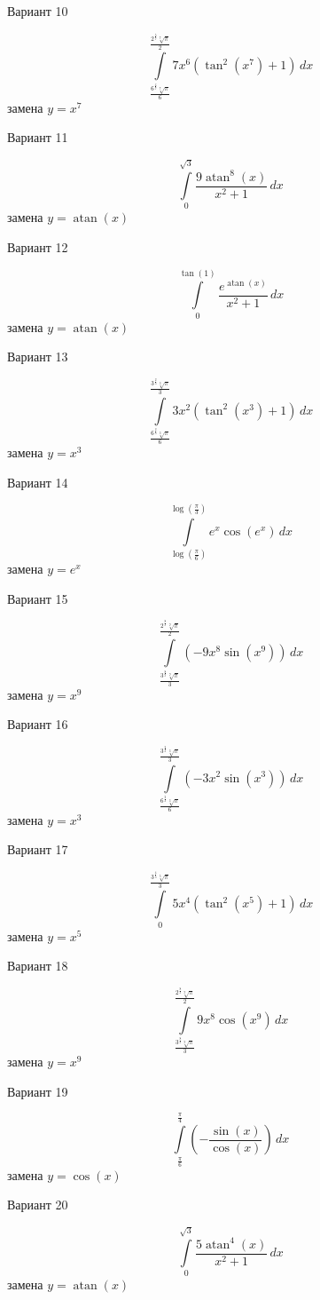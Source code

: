 \documentclass[11pt]{report}
\begin{document}
Вариант 10

$$\int\limits_{\frac{6^{\frac{6}{7}} \sqrt[7]{\pi}}{6}}^{\frac{2^{\frac{5}{7}} \sqrt[7]{\pi}}{2}} 7 x^{6} \left(\tan^{2}{\left(x^{7} \right)} + 1\right)\, dx$$
замена $y = x^{7}$

Вариант 11

$$\int\limits_{0}^{\sqrt{3}} \frac{9 \operatorname{atan}^{8}{\left(x \right)}}{x^{2} + 1}\, dx$$
замена $y = \operatorname{atan}{\left(x \right)}$

Вариант 12

$$\int\limits_{0}^{\tan{\left(1 \right)}} \frac{e^{\operatorname{atan}{\left(x \right)}}}{x^{2} + 1}\, dx$$
замена $y = \operatorname{atan}{\left(x \right)}$

Вариант 13

$$\int\limits_{\frac{6^{\frac{2}{3}} \sqrt[3]{\pi}}{6}}^{\frac{3^{\frac{2}{3}} \sqrt[3]{\pi}}{3}} 3 x^{2} \left(\tan^{2}{\left(x^{3} \right)} + 1\right)\, dx$$
замена $y = x^{3}$

Вариант 14

$$\int\limits_{\log{\left(\frac{\pi}{6} \right)}}^{\log{\left(\frac{\pi}{3} \right)}} e^{x} \cos{\left(e^{x} \right)}\, dx$$
замена $y = e^{x}$

Вариант 15

$$\int\limits_{\frac{3^{\frac{8}{9}} \sqrt[9]{\pi}}{3}}^{\frac{2^{\frac{8}{9}} \sqrt[9]{\pi}}{2}} \left(- 9 x^{8} \sin{\left(x^{9} \right)}\right)\, dx$$
замена $y = x^{9}$

Вариант 16

$$\int\limits_{\frac{6^{\frac{2}{3}} \sqrt[3]{\pi}}{6}}^{\frac{3^{\frac{2}{3}} \sqrt[3]{\pi}}{3}} \left(- 3 x^{2} \sin{\left(x^{3} \right)}\right)\, dx$$
замена $y = x^{3}$

Вариант 17

$$\int\limits_{0}^{\frac{3^{\frac{4}{5}} \sqrt[5]{\pi}}{3}} 5 x^{4} \left(\tan^{2}{\left(x^{5} \right)} + 1\right)\, dx$$
замена $y = x^{5}$

Вариант 18

$$\int\limits_{\frac{3^{\frac{8}{9}} \sqrt[9]{\pi}}{3}}^{\frac{2^{\frac{8}{9}} \sqrt[9]{\pi}}{2}} 9 x^{8} \cos{\left(x^{9} \right)}\, dx$$
замена $y = x^{9}$

Вариант 19

$$\int\limits_{\frac{\pi}{6}}^{\frac{\pi}{4}} \left(- \frac{\sin{\left(x \right)}}{\cos{\left(x \right)}}\right)\, dx$$
замена $y = \cos{\left(x \right)}$

Вариант 20

$$\int\limits_{0}^{\sqrt{3}} \frac{5 \operatorname{atan}^{4}{\left(x \right)}}{x^{2} + 1}\, dx$$
замена $y = \operatorname{atan}{\left(x \right)}$
\end{document}
